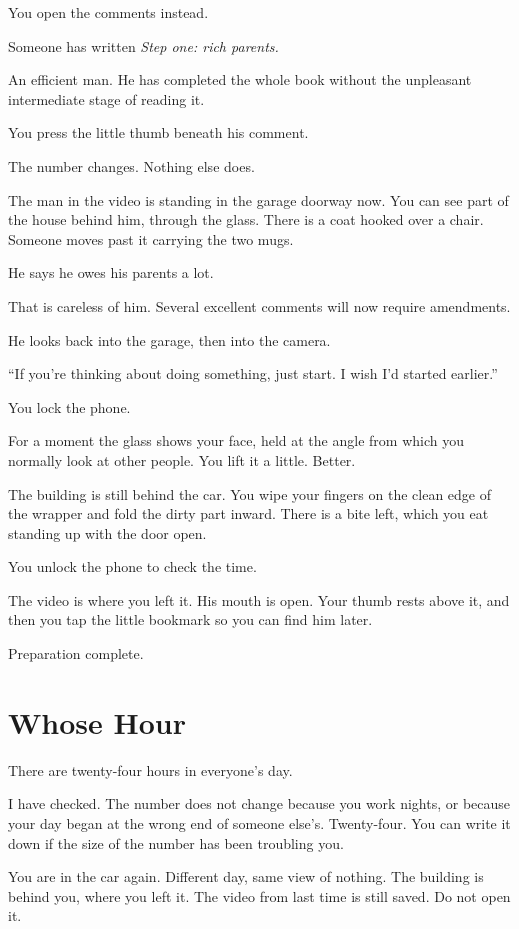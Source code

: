 \documentclass[11pt,oneside]{book}
\begin{document}
You open the comments instead.

Someone has written \emph{Step one: rich parents.}

An efficient man. He has completed the whole book without the unpleasant intermediate stage of reading it.

You press the little thumb beneath his comment.

The number changes. Nothing else does.

The man in the video is standing in the garage doorway now. You can see part of the house behind him, through the glass. There is a coat hooked over a chair. Someone moves past it carrying the two mugs.

He says he owes his parents a lot.

That is careless of him. Several excellent comments will now require amendments.

He looks back into the garage, then into the camera.

``If you're thinking about doing something, just start. I wish I'd started earlier.''

You lock the phone.

For a moment the glass shows your face, held at the angle from which you normally look at other people. You lift it a little. Better.

The building is still behind the car. You wipe your fingers on the clean edge of the wrapper and fold the dirty part inward. There is a bite left, which you eat standing up with the door open.

You unlock the phone to check the time.

The video is where you left it. His mouth is open. Your thumb rests above it, and then you tap the little bookmark so you can find him later.

Preparation complete.

\chapter*{Whose Hour}

There are twenty-four hours in everyone's day.

I have checked. The number does not change because you work nights, or because your day began at the wrong end of someone else's. Twenty-four. You can write it down if the size of the number has been troubling you.

You are in the car again. Different day, same view of nothing. The building is behind you, where you left it. The video from last time is still saved. Do not open it.
\end{document}
